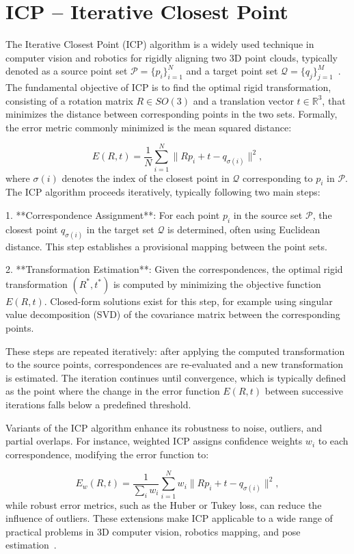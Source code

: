 \documentclass[english, bachelor, utf8]{base/thesis_telematics}
\begin{document}
\section{ICP -- Iterative Closest Point}
The Iterative Closest Point (ICP) algorithm is a widely used technique in computer vision and robotics for rigidly 
aligning two 3D point clouds, typically denoted as a source point set $\mathcal{P} = \{p_i\}_{i=1}^N$ and a target point 
set $\mathcal{Q} = \{q_j\}_{j=1}^M$~\cite{Zhang2016}. The fundamental objective of ICP is to find the optimal rigid 
transformation, consisting of a rotation matrix $R \in SO(3)$ and a translation vector $t \in \mathbb{R}^3$, that minimizes 
the distance between corresponding points in the two sets. Formally, the error metric commonly minimized is the mean 
squared distance:

\[
E(R, t) = \frac{1}{N} \sum_{i=1}^{N} \| R p_i + t - q_{\sigma(i)} \|^2,
\]
where $\sigma(i)$ denotes the index of the closest point in $\mathcal{Q}$ corresponding to $p_i$ in $\mathcal{P}$. The ICP 
algorithm proceeds iteratively, typically following two main steps:

1. **Correspondence Assignment**: For each point $p_i$ in the source set $\mathcal{P}$, the closest point $q_{\sigma(i)}$ 
in the target set $\mathcal{Q}$ is determined, often using Euclidean distance. This step establishes a provisional mapping 
between the point sets.

2. **Transformation Estimation**: Given the correspondences, the optimal rigid transformation $(R^*, t^*)$ is computed by 
minimizing the objective function $E(R, t)$. Closed-form solutions exist for this step, for example using singular value 
decomposition (SVD) of the covariance matrix between the corresponding points.

These steps are repeated iteratively: after applying the computed transformation to the source points, correspondences are 
re-evaluated and a new transformation is estimated. The iteration continues until convergence, which is typically defined 
as the point where the change in the error function $E(R, t)$ between successive iterations falls below a predefined 
threshold.  

Variants of the ICP algorithm enhance its robustness to noise, outliers, and partial overlaps. For instance, weighted ICP 
assigns confidence weights $w_i$ to each correspondence, modifying the error function to:

\[
E_w(R, t) = \frac{1}{\sum_i w_i} \sum_{i=1}^{N} w_i \| R p_i + t - q_{\sigma(i)} \|^2,
\]
while robust error metrics, such as the Huber or Tukey loss, can reduce the influence of outliers. These extensions make 
ICP applicable to a wide range of practical problems in 3D computer vision, robotics mapping, and pose estimation~\cite{Zhang2016}. 
\end{document}
